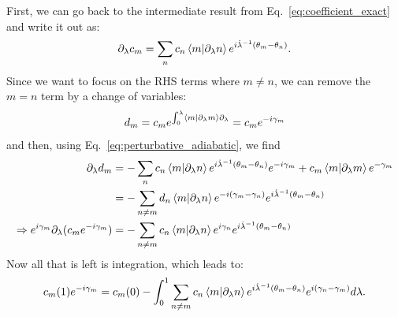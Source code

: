 \documentclass[a4paper,oneside,11pt]{book}
\newcommand{\dlambda}{\partial_{\lambda}}
\newcommand{\dotlambda}{\dot{\lambda}}
\begin{document}
    First, we can go back to the intermediate result from Eq.~\eqref{eq:coefficient_exact} and write it out as:
    \begin{equation}\label{eq:perturbative_adiabatic}
        \dlambda c_m = \sum_n c_n \braket{m}{\dlambda n}e^{i\dotlambda^{-1}(\theta_m - \theta_n)}.
    \end{equation}
    Since we want to focus on the RHS terms where $m \neq n$, we can remove the $m = n$ term by a change of variables:
    \begin{equation}\label{eq:changing_variables}
        d_m = c_m e^{\int_0^{\lambda}\braket{m}{\dlambda m} \dlambda} = c_m e^{-i\gamma_m}
    \end{equation}
    and then, using Eq.~\eqref{eq:perturbative_adiabatic}, we find
    \begin{equation}\label{eq:n_neq_m_terms}
        \begin{aligned}
            \dlambda d_m &= - \sum_n c_n \braket{m}{\dlambda n}e^{i\dotlambda^{-1}(\theta_m - \theta_n)}e^{-i\gamma_m} + c_m \braket{m}{\dlambda m} e^{-\gamma_m} \\
            &= - \sum_{n \neq m} d_n \braket{m}{\dlambda n} e^{-i(\gamma_m - \gamma_n)} e^{i\dotlambda^{-1}(\theta_m - \theta_n)} \\
            \Rightarrow{} e^{i\gamma_m} \dlambda(c_m e^{-i\gamma_m}) &= - \sum_{n \neq m} c_n \braket{m}{\dlambda n} e^{i \gamma_n} e^{i\dotlambda^{-1}(\theta_m - \theta_n)}
        \end{aligned}
    \end{equation}
    Now all that is left is integration, which leads to:
    \begin{equation}\label{eq:adiabatic_coefficients_dyanmics}
        c_m(1)e^{-i\gamma_m} = c_m(0) - \int_0^1 \sum_{n \neq m} c_n \braket{m}{\dlambda n} e^{i\dotlambda^{-1}(\theta_m - \theta_n)} e^{i(\gamma_n - \gamma_m)} d \lambda.
    \end{equation}
\end{document}

